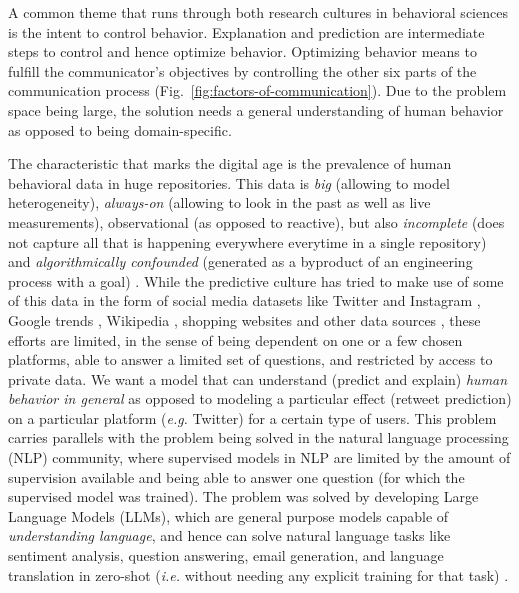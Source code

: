 \documentclass[PhD]{iiitd}
\renewcommand{\cite}[1]{\citep{#1}}
\begin{document}
A common theme that runs through both research cultures in behavioral sciences is the intent to control behavior. Explanation and prediction are intermediate steps to control and hence optimize behavior. Optimizing behavior means to fulfill the communicator's objectives by controlling the other six parts of the communication process (Fig.~\ref{fig:factors-of-communication}). Due to the problem space being large, the solution needs a general understanding of human behavior as opposed to being domain-specific. 


The characteristic that marks the digital age is the prevalence of human behavioral data in huge repositories. This data is \textit{big} (allowing to model heterogeneity), \textit{always-on} (allowing to look in the past as well as live measurements), observational (as opposed to reactive), but also \textit{incomplete} (does not capture all that is happening everywhere everytime in a single repository) and \textit{algorithmically confounded} (generated as a byproduct of an engineering process with a goal) \cite{salganik2019bit}. While the predictive culture has tried to make use of some of this data in the form of social media datasets like Twitter \cite{tumasjan2010predicting,asur2010predicting} and Instagram \cite{kim2020multimodal}, Google trends \cite{choi2012predicting,carriere2013nowcasting}, Wikipedia \cite{generous2014global,de2021general,mestyan2013early}, shopping websites \cite{krumme2013predictability,de2015unique} and other data sources \cite{brockmann2006scaling,song2010limits,miritello2013limited}, these efforts are limited, in the sense of being dependent on one or a few chosen platforms, able to answer a limited set of questions, and restricted by access to private data. We want a model that can understand (predict and explain) \textit{human behavior in general} as opposed to modeling a particular effect (retweet prediction) on a particular platform (\textit{e.g.} Twitter) for a certain type of users.
This problem carries parallels with the problem being solved in the natural language processing (NLP) community, where supervised models in NLP are limited by the amount of supervision available and being able to answer one question (for which the supervised model was trained). The problem was solved by developing Large Language Models (LLMs), which are general purpose models capable of \textit{understanding language}, and hence can solve natural language tasks like sentiment analysis, question answering, email generation, and language translation in zero-shot (\textit{i.e.} without needing any explicit training for that task) \cite{devlin2018bert,brown2020language,radford2018improving,raffel2020exploring,radford2019language}.
\end{document}
